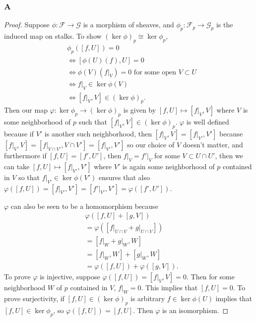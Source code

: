 \documentclass{article}
\newcommand{\fF}{\mathscr{F}}
\newcommand{\fG}{\mathscr{G}}
\begin{document}
\subsubsection{A}\label{2.6.A}
\begin{proof}
    Suppose $\phi:\fF\to \fG$ is a morphism of sheaves, and $\phi_p:\fF_p\to \fG_p$ is the induced map on stalks. To show $(\ker \phi)_p\cong \ker \phi_p$,
    \begin{align*}
        &\phi_p([f,U])=0\\
        &\iff [\phi(U)(f),U]=0\\
        &\iff \phi(V)(f\vert_V)=0 \text{ for some open $V\subset U$}\\
        &\iff f\vert_V\in \ker \phi(V)\\
        &\iff [f\vert_V,V]\in (\ker \phi)_p.
    \end{align*}
    Then our map $\varphi:\ker \phi_p\to (\ker \phi)_p$ is given by $[f,U]\mapsto [f\vert_V,V]$ where $V$ is some neighborhood of $p$ such that $[f\vert_V,V]\in (\ker \phi)_p$. $\varphi$ is well defined because if $V'$ is another such neighborhood, then $[f\vert_{V},V]=[f\vert_{V'},V']$ because $[f\vert_V,V]=[f\vert_{V\cap V'},V\cap V']=[f\vert_{V'},V']$ so our choice of $V$ doesn't matter, and furthermore if $[f,U]=[f',U']$, then $f\vert_V=f'\vert_V$ for some $V\subset U\cap U'$, then we can take $[f,U]\mapsto [f\vert_{V'}, V']$ where $V'$ is again some neighborhood of $p$ contained in $V$ so that $f\vert_{V'}\in \ker \phi(V')$ ensures that also $\varphi([f,U])=[f\vert_{V'},V']=[f'\vert_{V'},V']=\varphi([f',U'])$.

    \vspace{0.1in}
    $\varphi$ can also be seen to be a homomorphism because
    \begin{align*}
        &\varphi([f,U]+[g,V])\\
        &=\varphi([f\vert_{U\cap V}+g\vert_{U\cap V}])\\
        &= [f\vert_W+g\vert_W,W]\\
        &=[f\vert_W,W]+[g\vert_W,W]\\
        &=\varphi([f,U])+\varphi([g,V]).
    \end{align*}
    To prove $\varphi$ is injective, suppose $\varphi([f,U])=[f\vert_V,V]=0$. Then for some neighborhood $W$ of $p$ contained in $V$, $f\vert_W=0$. This implies that $[f,U]=0$. To prove surjectivity, if $[f,U]\in (\ker \phi)_p$ is arbitrary $f\in \ker \phi(U)$ implies that $[f,U]\in \ker \phi_p$, so $\varphi([f,U])=[f,U]$. Then $\varphi$ is an isomorphism.
\end{proof}
\end{document}
